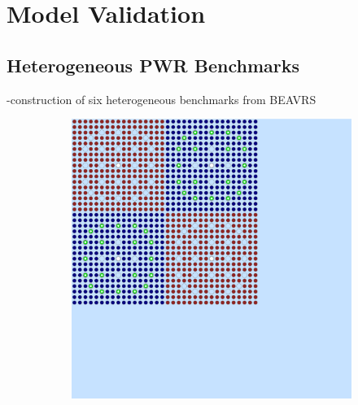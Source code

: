 \documentclass[12pt,twoside]{mitthesis-exec}
\begin{document}
\clearpage

\section*{Model Validation}

\subsection*{Heterogeneous PWR Benchmarks}

-construction of six heterogeneous benchmarks from BEAVRS~\cite{horelik2013beavrs} \\

\clearpage

\begin{figure}[h!]
\centering
\begin{subfigure}{0.47\textwidth}
  \centering
  \includegraphics[width=0.93\linewidth]{figures/benchmarks/reflector}
  \caption{}
  \label{fig:reflector}
\end{subfigure}%
\begin{subfigure}{0.47\textwidth}
  \centering

\end{subfigure}
\end{figure}
\end{document}
